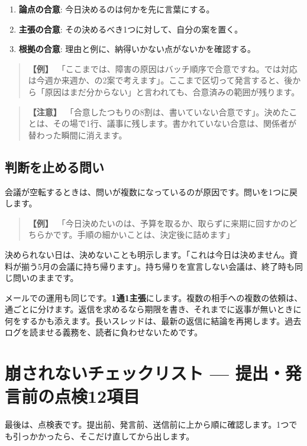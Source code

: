 \documentclass{article}
\begin{document}
\begin{enumerate}
\item \textbf{論点の合意}: 今日決めるのは何かを先に言葉にする。
\item \textbf{主張の合意}: その決めるべき1つに対して、自分の案を置く。
\item \textbf{根拠の合意}: 理由と例に、納得いかない点がないかを確認する。
\end{enumerate}

\begin{quote}
\textbf{【例】}\ 「ここまでは、障害の原因はバッチ順序で合意ですね。では対応は今週か来週か、の2案で考えます」。ここまで区切って発言すると、後から「原因はまだ分からない」と言われても、合意済みの範囲が残ります。
\end{quote}

\begin{quote}
\textbf{【注意】}\ 「合意したつもりの8割は、書いていない合意です」。決めたことは、その場で1行、議事に残します。書かれていない合意は、関係者が替わった瞬間に消えます。
\end{quote}

\subsection{判断を止める問い}

会議が空転するときは、問いが複数になっているのが原因です。問いを1つに戻します。

\begin{quote}
\textbf{【例】}\ 「今日決めたいのは、予算を取るか、取らずに来期に回すかのどちらかです。手順の細かいことは、決定後に詰めます」
\end{quote}

決められない日は、決めないことも明示します。「これは今日は決めません。資料が揃う5月の会議に持ち帰ります」。持ち帰りを宣言しない会議は、終了時も同じ問いのままです。

メールでの運用も同じです。\textbf{1通1主張}にします。複数の相手への複数の依頼は、通ごとに分けます。返信を求めるなら期限を書き、それまでに返事が無いときに何をするかも添えます。長いスレッドは、最新の返信に結論を再掲します。過去ログを読ませる義務を、読者に負わせないためです。

\section{崩されないチェックリスト — 提出・発言前の点検12項目}

最後は、点検表です。提出前、発言前、送信前に上から順に確認します。1つでも引っかかったら、そこだけ直してから出します。
\end{document}
